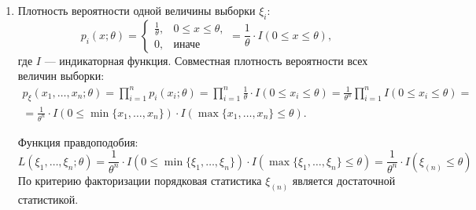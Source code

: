 \documentclass[a4paper,12pt]{article}
\begin{document}
\begin{enumerate}
    \item Плотность вероятности одной величины выборки $\xi_i$:
          \[
              p_i(x; \theta)
              = \left \{
              \begin{array}{ll}
                  \frac{1}{\theta}, & 0 \le x \le \theta , \\
                  0,                & \text{иначе}
              \end{array}
              \right .
              = \frac{1}{\theta} \cdot I(0 \le x \le \theta) ,
          \]
          где $I$ --- индикаторная функция.
          Совместная плотность вероятности всех величин выборки:
          \begin{multline*}
              p_\xi(x_1, \dots, x_n; \theta)
              = \prod_{i=1}^n p_i(x_i; \theta)
              = \prod_{i=1}^n \frac{1}{\theta} \cdot I(0 \le x_i \le \theta)
              = \frac{1}{\theta^n} \prod_{i=1}^n I(0 \le x_i \le \theta) = \\
              = \frac{1}{\theta^n} \cdot I(0 \le \min \{ x_1, \dots, x_n \}) \cdot I(\max \{ x_1, \dots, x_n \} \le \theta) .
          \end{multline*}

          Функция правдоподобия:
          \[
              L(\xi_1, \dots, \xi_n; \theta)
              = \frac{1}{\theta^n} \cdot I(0 \le \min \{ \xi_1, \dots, \xi_n \}) \cdot I(\max \{ \xi_1, \dots, \xi_n \} \le \theta)
              = \frac{1}{\theta^n} \cdot I(\xi_{(n)} \le \theta)
          \]
          По критерию факторизации порядковая статистика $\xi_{(n)}$ является достаточной статистикой.


\end{enumerate}
\end{document}
